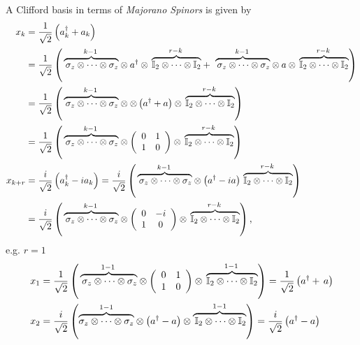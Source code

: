 \documentclass[aps,preprint]{revtex4}%
\begin{document}
A Clifford basis in terms of \emph{Majorano Spinors }is given by
\begin{align}
x_{k}  &  =\frac{1}{\sqrt{2}}\left(  a_{k}^{\dagger}+a_{k}\right) \nonumber\\
&  =\frac{1}{\sqrt{2}}\left(  \overset{k-1}{\,\overbrace{\,\mathbb{\sigma}%
_{z}\otimes\cdots\otimes\mathbb{\sigma}_{z}}}\otimes a^{\dagger}%
\otimes\overset{r-k}{\,\overbrace{\mathbb{I}_{2}\otimes\cdots\otimes
\mathbb{I}_{2}}}+\,\overset{k-1}{\,\overbrace{\,\mathbb{\sigma}_{z}%
\otimes\cdots\otimes\mathbb{\sigma}_{z}}}\otimes a\otimes
\overset{r-k}{\,\overbrace{\mathbb{I}_{2}\otimes\cdots\otimes\mathbb{I}_{2}}%
}\right) \nonumber\\
&  =\frac{1}{\sqrt{2}}\left(  \overset{k-1}{\,\overbrace{\,\mathbb{\sigma}%
_{z}\otimes\cdots\otimes\mathbb{\sigma}_{z}}}\otimes\otimes\left(  a^{\dagger
}+a\right)  \otimes\overset{r-k}{\,\overbrace{\mathbb{I}_{2}\otimes
\cdots\otimes\mathbb{I}_{2}}}\right) \nonumber\\
&  =\frac{1}{\sqrt{2}}\left(  \overset{k-1}{\,\overbrace{\,\mathbb{\sigma}%
_{z}\otimes\cdots\otimes\mathbb{\sigma}_{z}}}\otimes\left(
\begin{array}
[c]{cc}%
0 & 1\\
1 & 0
\end{array}
\right)  \otimes\overset{r-k}{\,\overbrace{\mathbb{I}_{2}\otimes\cdots
\otimes\mathbb{I}_{2}}}\right) \nonumber\\
x_{k+r}  &  =\frac{i}{\sqrt{2}}\left(  a_{k}^{\dagger}-ia_{k}\right)
=\frac{i}{\sqrt{2}}\left(  \overset{k-1}{\,\overbrace{\,\mathbb{\sigma}%
_{z}\otimes\cdots\otimes\mathbb{\sigma}_{z}}}\otimes\left(  a^{\dagger
}-ia\right)  \overset{r-k}{\,\overbrace{\mathbb{I}_{2}\otimes\cdots
\otimes\mathbb{I}_{2}}}\right) \nonumber\\
&  =\frac{i}{\sqrt{2}}\left(  \overset{k-1}{\,\overbrace{\,\mathbb{\sigma}%
_{z}\otimes\cdots\otimes\mathbb{\sigma}_{z}}}\otimes\left(
\begin{array}
[c]{cc}%
0 & -i\\
1 & 0
\end{array}
\right)  \otimes\overset{r-k}{\,\overbrace{\mathbb{I}_{2}\otimes\cdots
\otimes\mathbb{I}_{2}}}\right)  ,
\end{align}
e.g. $r=1$%
\begin{align}
x_{1}  &  =\frac{1}{\sqrt{2}}\left(
\overset{1-1}{\,\overbrace{\,\mathbb{\sigma}_{z}\otimes\cdots\otimes
\mathbb{\sigma}_{z}}}\otimes\left(
\begin{array}
[c]{cc}%
0 & 1\\
1 & 0
\end{array}
\right)  \otimes\overset{1-1}{\,\overbrace{\mathbb{I}_{2}\otimes\cdots
\otimes\mathbb{I}_{2}}}\right)  =\frac{1}{\sqrt{2}}\left(  a^{\dagger
}+\,a\right) \\
x_{2}  &  =\frac{i}{\sqrt{2}}\left(  \overset{1-1}{\overbrace{\mathbb{\sigma
}_{z}\otimes\cdots\otimes\mathbb{\sigma}_{z}}}\otimes\left(  a^{\dagger
}-a\right)  \otimes\overset{1-1}{\overbrace{\,\mathbb{I}_{2}\otimes
\cdots\otimes\mathbb{I}_{2}}}\right)  =\frac{i}{\sqrt{2}}\left(  a^{\dagger
}-a\right)
\end{align}
\end{document}
